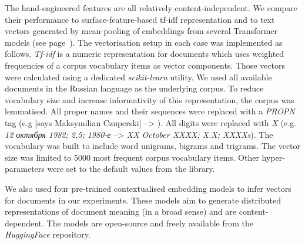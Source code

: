 The hand-engineered features are all relatively content-independent. We compare their performance to surface-feature-based \gls{tf-idf} representation and to text vectors generated by mean-pooling of embeddings from several Transformer models (see page~\pageref{pg:embeddings}).
The vectorisation setup in each case was implemented as follows.
\label{pg:tfidf_meth}\textit{Tf-idf} is a numeric representation for documents which uses weighted frequencies of a corpus vocabulary items as vector components. Those vectors were calculated using a dedicated \textit{scikit-learn} utility. We used all available documents in the Russian language as the underlying corpus. 
To reduce vocabulary size and increase informativity of this representation, the corpus was lemmatised. All proper names and their sequences were replaced with a \textit{PROPN} tag (e.g  [says Maksymilian Czuperski] --> ). All digits were replaced with \textit{X} (e.g. \textit{12 октября 1982; 2,5;  1980-е} --> \textit{XX October XXXX; X.X; XXXXs}). The vocabulary was built to include word unigrams, bigrams and trigrams. The vector size was limited to 5000 most frequent corpus vocabulary items. Other hyper-parameters were set to the default values from the library. 

We also used four pre-trained contextualised embedding models to infer vectors for documents in our experiments. These models aim to generate distributed representations of document meaning (in a broad sense) and are content-dependent. The models are open-source and freely available from the \textit{HuggingFace} repository.

